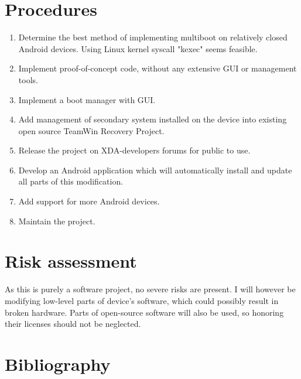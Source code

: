 \documentclass[12pt, a4paper, oneside]{article}
\begin{document}
\newpage
\section{Procedures}
\begin{enumerate}
    \item Determine the best method of implementing multiboot on relatively closed Android devices\cite{androidboot}. Using Linux kernel syscall "kexec"\cite{kexec} seems feasible.
    \item Implement proof-of-concept code, without any extensive GUI or management tools.
    \item Implement a boot manager with GUI.
    \item Add management of secondary system installed on the device into existing open source TeamWin Recovery Project\cite{twrp}.
    \item Release the project on XDA-developers\cite{xda} forums for public to use.
    \item Develop an Android application which will automatically install and update all parts of this modification.
    \item Add support for more Android devices.
    \item Maintain the project.
\end{enumerate}

\section{Risk assessment}
As this is purely a software project, no severe risks are present. I will however be modifying low-level parts of device's software, which could possibly result in broken hardware. Parts of open-source software will also be used, so honoring their licenses should not be neglected.

\section{Bibliography}
\printbibliography[heading=none]
\end{document}
